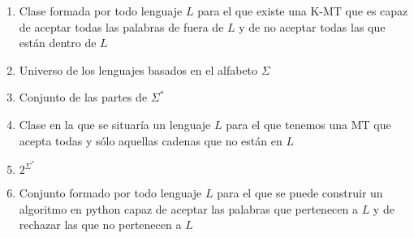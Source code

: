 \documentclass{article}
\begin{document}
\begin{enumerate}[1.]
\item  Clase formada por todo lenguaje $L$ para el que existe una K-MT que es capaz de aceptar todas las palabras de fuera de $L$ y de no aceptar todas las que están dentro de $L$
\item  Universo de los lenguajes basados en el alfabeto $\Sigma$
\item  Conjunto de las partes de $\Sigma^*$
\item  Clase en la que se situaría un lenguaje $L$ para el que tenemos una  MT que acepta todas y sólo aquellas cadenas que no están en $L$
\item $2^{\Sigma^*}$
\item  Conjunto formado por todo lenguaje $L$ para el que se puede construir un algoritmo en python capaz de aceptar las palabras que pertenecen a $L$ y de rechazar las que no pertenecen a $L$

\end{enumerate}



%
%
\end{document}
